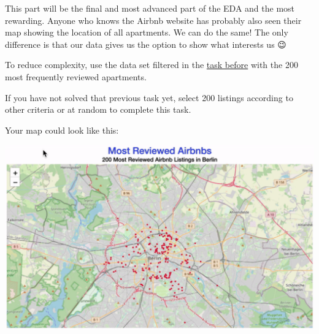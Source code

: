 \documentclass[
  11pt,
]{article}
\begin{document}
This part will be the final and most advanced part of the EDA and the most rewarding.
Anyone who knows the Airbnb website has probably also seen their map showing the location of all apartments.
We can do the same!
The only difference is that our data gives us the option to show what interests us 😉

To reduce complexity, use the data set filtered in the \href{https://tech-academy-ev.github.io/exploratory-data-analysis.html\#your-first-barplot}{task before} with the 200 most frequently reviewed apartments.

If you have not solved that previous task yet, select 200 listings according to other criteria or at random to complete this task.

Your map could look like this:

\begin{center}\includegraphics[width=1\linewidth]{plot/01_python/map_circles} \end{center}
\end{document}
